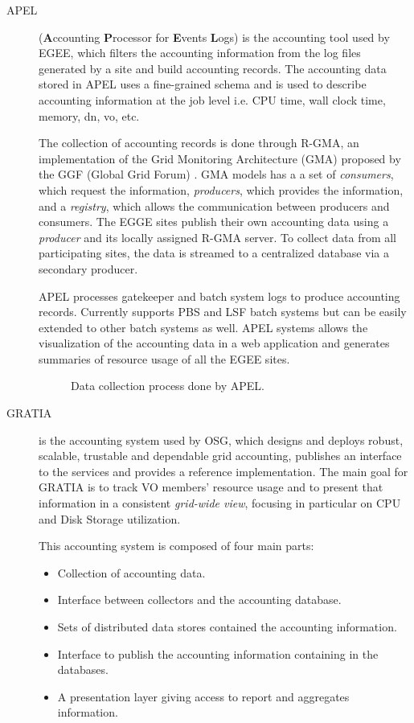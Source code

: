 \begin{description}
\item[APEL]\cite{APEL}
({\bf A}ccounting {\bf P}rocessor for {\bf E}vents {\bf L}ogs)
is the accounting tool used by EGEE, which filters the accounting
information from the log files generated by a site and build
accounting records.
The accounting data stored in APEL uses a fine-grained schema and is
used to describe accounting information at the job level i.e. CPU
time, wall clock time, memory, dn, vo, etc.

The collection of accounting records is done through
R-GMA, an implementation of the Grid Monitoring
Architecture (GMA) proposed by the GGF (Global Grid Forum)
 \cite{OGF}.
GMA models has a a set of {\itshape consumers}, which request the
information, {\itshape producers}, which provides the information, and a
{\itshape registry}, which allows the communication between producers and
consumers.
The EGGE sites publish their own accounting data using a
{\itshape producer} and its locally assigned R-GMA server.
To collect data from all participating sites, the data is streamed to
a centralized database via a secondary producer.

APEL processes gatekeeper and batch system logs to produce accounting
records.
Currently supports PBS and LSF batch systems but can be easily
extended to other batch systems as well.
APEL systems allows the visualization of the accounting data in a web
application and generates summaries of resource usage of all the EGEE
sites.

\begin{figure}[h!tbp]
\centering
{}
\caption{Data collection process done by APEL.}
\label{fig:apel}
\end{figure}


\item
[GRATIA]\cite{GRATIA} is the accounting system used by OSG, which
designs and deploys robust, scalable, trustable and dependable grid
accounting, publishes an interface to the services and provides a
reference implementation. 
The main goal for GRATIA is to track VO members' resource usage and to
present that information in a consistent {\itshape grid-wide view},
focusing in particular on CPU and Disk Storage utilization.

This accounting system is composed of four main parts:
\begin{itemize}
\item Collection of accounting data.
\item Interface between collectors and the accounting database.
\item Sets of distributed data stores contained the accounting
      information.
\item Interface to publish the accounting information containing in
      the databases.
\item A presentation layer giving access to report and aggregates
      information.
\end{itemize}


\end{description}
